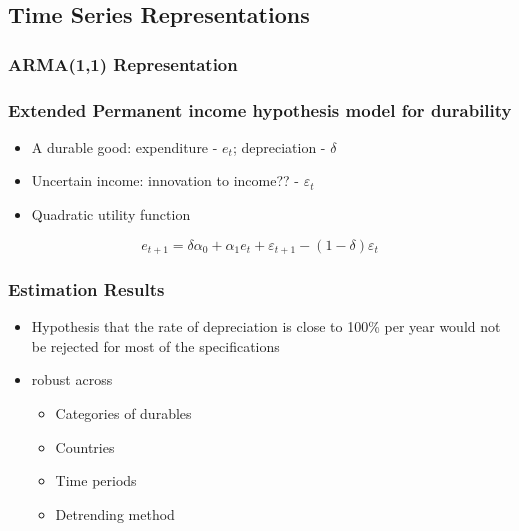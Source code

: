 \documentclass{beamer}
\begin{document}
\subsection{Time Series Representations}
\subsubsection{ARMA(1,1) Representation}
\begin{frame}
\frametitle{Extended Permanent income hypothesis model for durability}
\begin{itemize}
\item A durable good: expenditure - $e_t$; depreciation - $\delta$
\item Uncertain income: innovation to income?? - $\varepsilon_t$
\item Quadratic utility function
\end{itemize}
$$
e_{t+1}=\delta \alpha_0 +\alpha_1 e_t + \varepsilon_{t+1} - (1-\delta)\varepsilon_t
$$
\end{frame}

\begin{frame}
\frametitle{Estimation Results}
\begin{itemize}
\item Hypothesis that the rate of depreciation is close to 100\% per year would not be rejected for most of the
specifications
\item robust across
\begin{itemize}
\item Categories of durables
\item Countries
\item Time periods
\item Detrending method %
\end{itemize}
\end{itemize}
\end{frame}
\end{document}
